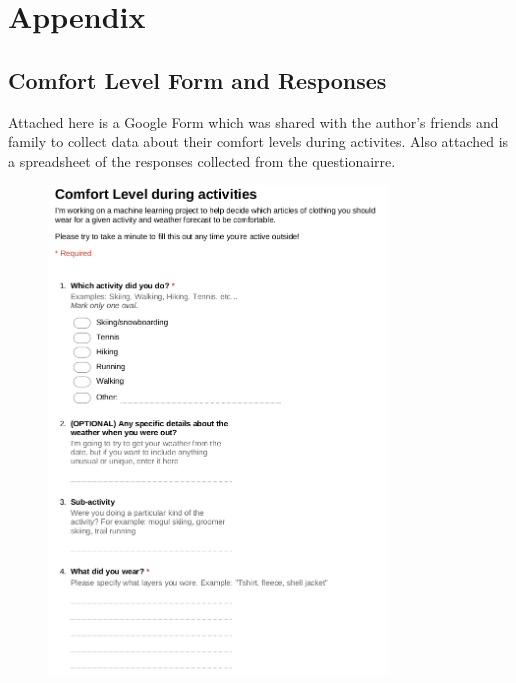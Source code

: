 \clearpage
\section{Appendix}
\label{appendix}

\subsection{Comfort Level Form and Responses}
\label{appendix:comfort}
Attached here is a Google Form which was shared with the author's friends and family to collect data about their
comfort levels during activites. Also attached is a spreadsheet of the responses collected from the questionairre.


\begin{figure}[ht!]
    \centering
    \includegraphics[width=90mm]{img/survey.png}
    \label{appendix:comfort_form}
\end{figure}

\label{appendix:comfort_responses}



